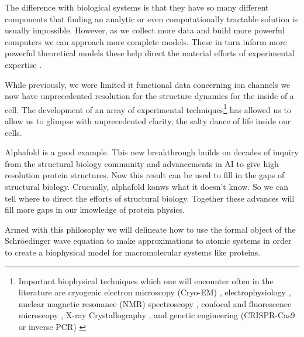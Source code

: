 The difference with biological systems is that they have so many different components that finding an analytic or even computationally tractable solution is usually impossible. However, as we collect more data and build more powerful computers we can approach more complete models. These in turn inform more powerful theoretical models these help direct the material efforts of experimental expertise . 

While previously, we were limited it functional data concerning ion channels we now have unprecedented resolution for the structure dynamics for the inside of a cell. The development of an array of experimental techniques\footnote{Important biophysical techniques which one will encounter often in the literature are cryogenic electron microscopy (Cryo-EM) \cite{cheng2015}, electrophysiology \cite{aidley1996}, nuclear magnetic resonance (NMR) spectroscopy \cite{marion2013}, confocal and fluorescence microscopy \cite{sanderson2014}, X-ray Crystallography \cite{frauenfelder2010}, and genetic engineering (CRISPR-Cas9 or inverse PCR) \cite{silva2017, crispr2019}} has allowed us to allow us to glimpse with unprecedented clarity, the salty dance of life inside our cells.

Alphafold is a good example. This new breakthrough builds on decades of inquiry from the structural biology community and advancements in AI to give high resolution protein structures. Now this result can be used to fill in the gaps of structural biology. Crucually, alphafold konws what it doesn't know. So we can tell where to direct the efforts of structural biology. Together these advances will fill more gaps in our knowledge of protein physics. 

Armed with this philosophy we will delineate how to use the formal object of the Schr\"oedinger wave equation to make approximations to atomic systems in order to create a biophysical model for macromolecular systems like proteins.
